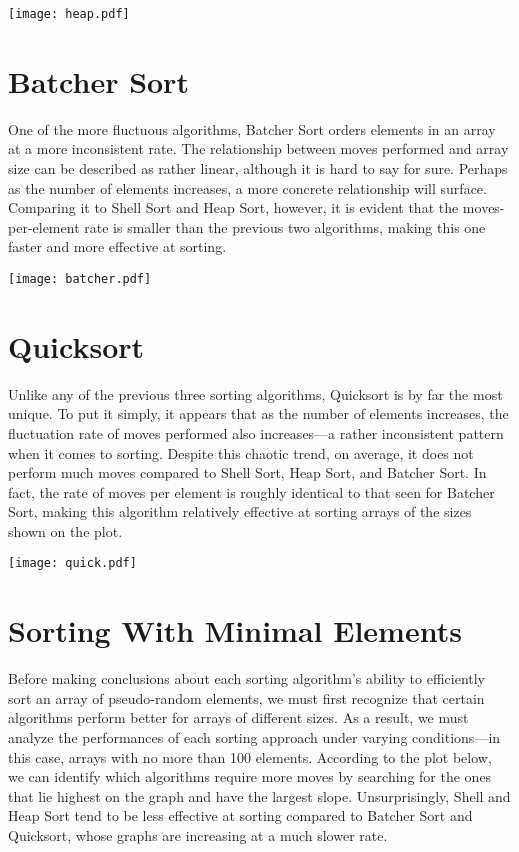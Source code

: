 \documentclass[12pt]{article}
\begin{document}
\vspace{0.35in}

\texttt{[image: heap.pdf]}

\section{Batcher Sort}

One of the more fluctuous algorithms, Batcher Sort orders elements in an array at a more inconsistent rate. The relationship between moves performed and array size can be described as rather linear, although it is hard to say for sure. Perhaps as the number of elements increases, a more concrete relationship will surface. Comparing it to Shell Sort and Heap Sort, however, it is evident that the moves-per-element rate is smaller than the previous two algorithms, making this one faster and more effective at sorting.

\vspace{0.3in}

\texttt{[image: batcher.pdf]}

\section{Quicksort}

Unlike any of the previous three sorting algorithms, Quicksort is by far the most unique. To put it simply, it appears that as the number of elements increases, the fluctuation rate of moves performed also increases---a rather inconsistent pattern when it comes to sorting. Despite this chaotic trend, on average, it does not perform much moves compared to Shell Sort, Heap Sort, and Batcher Sort. In fact, the rate of moves per element is roughly identical to that seen for Batcher Sort, making this algorithm relatively effective at sorting arrays of the sizes shown on the plot.

\texttt{[image: quick.pdf]}

\section{Sorting With Minimal Elements}

Before making conclusions about each sorting algorithm's ability to efficiently sort an array of pseudo-random elements, we must first recognize that certain algorithms perform better for arrays of different sizes. As a result, we must analyze the performances of each sorting approach under varying conditions---in this case, arrays with no more than 100 elements. According to the plot below, we can identify which algorithms require more moves by searching for the ones that lie highest on the graph and have the largest slope. Unsurprisingly, Shell and Heap Sort tend to be less effective at sorting compared to Batcher Sort and Quicksort, whose graphs are increasing at a much slower rate.
\end{document}
